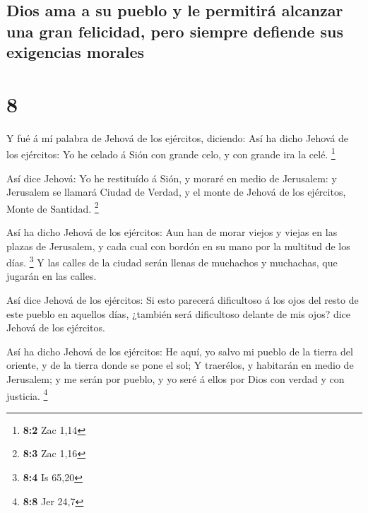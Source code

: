 \hypertarget{dios-ama-a-su-pueblo-y-le-permitiruxe1-alcanzar-una-gran-felicidad-pero-siempre-defiende-sus-exigencias-morales}{%
\subsection{Dios ama a su pueblo y le permitirá alcanzar una gran
felicidad, pero siempre defiende sus exigencias
morales}\label{dios-ama-a-su-pueblo-y-le-permitiruxe1-alcanzar-una-gran-felicidad-pero-siempre-defiende-sus-exigencias-morales}}

\hypertarget{section-7}{%
\section{8}\label{section-7}}

 Y fué á mí palabra de Jehová de los ejércitos, diciendo:
 Así ha dicho Jehová de los ejércitos: Yo he celado á Sión
con grande celo, y con grande ira la celé. \footnote{\textbf{8:2} Zac
  1,14}

 Así dice Jehová: Yo he restituído á Sión, y moraré en
medio de Jerusalem: y Jerusalem se llamará Ciudad de Verdad, y el monte
de Jehová de los ejércitos, Monte de Santidad. \footnote{\textbf{8:3}
  Zac 1,16}

 Así ha dicho Jehová de los ejércitos: Aun han de morar
viejos y viejas en las plazas de Jerusalem, y cada cual con bordón en su
mano por la multitud de los días. \footnote{\textbf{8:4} Is 65,20}
 Y las calles de la ciudad serán llenas de muchachos y
muchachas, que jugarán en las calles.

 Así dice Jehová de los ejércitos: Si esto parecerá
dificultoso á los ojos del resto de este pueblo en aquellos días,
¿también será dificultoso delante de mis ojos? dice Jehová de los
ejércitos.

 Así ha dicho Jehová de los ejércitos: He aquí, yo salvo
mi pueblo de la tierra del oriente, y de la tierra donde se pone el sol;
 Y traerélos, y habitarán en medio de Jerusalem; y me
serán por pueblo, y yo seré á ellos por Dios con verdad y con justicia.
\footnote{\textbf{8:8} Jer 24,7}

